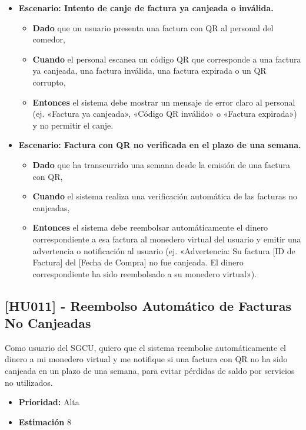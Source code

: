 \documentclass[12pt]{article}
\begin{document}
\begin{itemize}
	\item \textbf{Escenario: Intento de canje de factura ya canjeada o inválida.}
	\begin{itemize}
		\item \textbf{Dado} que un usuario presenta una factura con QR al personal del comedor,
		\item \textbf{Cuando} el personal escanea un código QR que corresponde a una factura ya canjeada, una factura inválida, una factura expirada o un QR corrupto,
		\item \textbf{Entonces} el sistema debe mostrar un mensaje de error claro al personal (ej. «Factura ya canjeada», «Código QR inválido» o «Factura expirada») y no permitir el canje.
	\end{itemize}

	\item \textbf{Escenario: Factura con QR no verificada en el plazo de una semana.}
	\begin{itemize}
		\item \textbf{Dado} que ha transcurrido una semana desde la emisión de una factura con QR,
		\item \textbf{Cuando} el sistema realiza una verificación automática de las facturas no canjeadas,
		\item \textbf{Entonces} el sistema debe reembolsar automáticamente el dinero correspondiente a esa factura al monedero virtual del usuario y emitir una advertencia o notificación al usuario (ej. «Advertencia: Su factura [ID de Factura] del [Fecha de Compra] no fue canjeada. El dinero correspondiente ha sido reembolsado a su monedero virtual»).
	\end{itemize}
\end{itemize}

\pagebreak

\subsection{[HU011] - Reembolso Automático de Facturas No Canjeadas}

Como usuario del SGCU, quiero que el sistema reembolse automáticamente el dinero a mi monedero virtual y me notifique si una factura con QR no ha sido canjeada en un plazo de una semana, para evitar pérdidas de saldo por servicios no utilizados.

\begin{itemize}
	\item \textbf{Prioridad:} Alta
	\item \textbf{Estimación} 8
\end{itemize}
\end{document}
